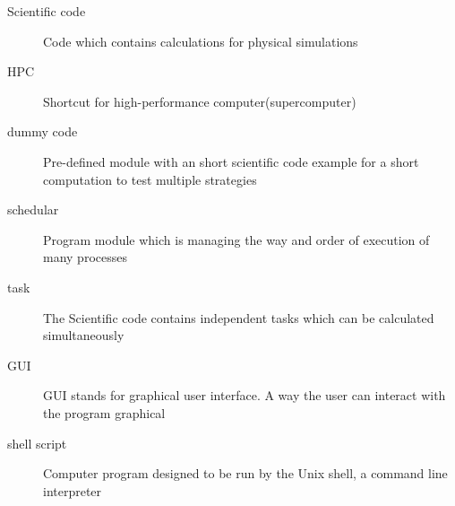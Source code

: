 \begin{description}
	\item[Scientific code] Code which contains calculations for physical simulations
	
	\item[HPC] Shortcut for high-performance computer(supercomputer)
	
	\item[dummy code] Pre-defined module with an short scientific code example for a short computation to test multiple strategies
	
	\item[schedular] Program module which is managing the way and order of execution of many processes
	
	\item[task] The Scientific code contains independent tasks which can be calculated simultaneously
	
	\item[GUI] GUI stands for graphical user interface. A way the user can interact with the program graphical
	
	\item[shell script] Computer program designed to be run by the Unix shell, a command line interpreter
\end{description}